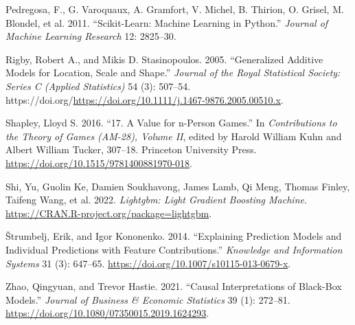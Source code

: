 \begin{CSLReferences}{1}{0}
\leavevmode{}%
Pedregosa, F., G. Varoquaux, A. Gramfort, V. Michel, B. Thirion, O. Grisel, M. Blondel, et al. 2011. {``Scikit-Learn: Machine Learning in {P}ython.''} \emph{Journal of Machine Learning Research} 12: 2825--30.

\leavevmode{}%
Rigby, Robert A., and Mikis D. Stasinopoulos. 2005. {``Generalized Additive Models for Location, Scale and Shape.''} \emph{Journal of the Royal Statistical Society: Series C (Applied Statistics)} 54 (3): 507--54. https://doi.org/\url{https://doi.org/10.1111/j.1467-9876.2005.00510.x}.

\leavevmode{}%
Shapley, Lloyd S. 2016. {``17. A Value for n-Person Games.''} In \emph{Contributions to the Theory of Games (AM-28), Volume II}, edited by Harold William Kuhn and Albert William Tucker, 307--18. Princeton University Press. \url{https://doi.org/10.1515/9781400881970-018}.

\leavevmode{}%
Shi, Yu, Guolin Ke, Damien Soukhavong, James Lamb, Qi Meng, Thomas Finley, Taifeng Wang, et al. 2022. \emph{Lightgbm: Light Gradient Boosting Machine}. \url{https://CRAN.R-project.org/package=lightgbm}.

\leavevmode{}%
Štrumbelj, Erik, and Igor Kononenko. 2014. {``Explaining Prediction Models and Individual Predictions with Feature Contributions.''} \emph{Knowledge and Information Systems} 31 (3): 647--65. \url{https://doi.org/10.1007/s10115-013-0679-x}.

\leavevmode{}%
Zhao, Qingyuan, and Trevor Hastie. 2021. {``Causal Interpretations of Black-Box Models.''} \emph{Journal of Business \& Economic Statistics} 39 (1): 272--81. \url{https://doi.org/10.1080/07350015.2019.1624293}.

\end{CSLReferences}



\address{%
Brandon M. Greenwell\\
University of Cincinnati\\%
2925 Campus Green Dr\\ Cincinnati, OH 45221\\ United States of America\\
%
\url{https://github.com/bgreenwell}\\%
\textit{ORCiD: \href{https://orcid.org/0000-0002-8120-0084}{0000-0002-8120-0084}}\\%
\href{mailto:greenwell.brandon@gmail.com}{\nolinkurl{greenwell.brandon@gmail.com}}%
}
